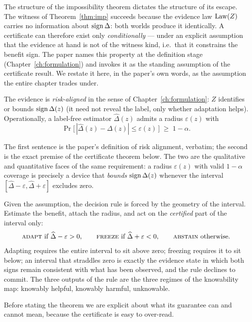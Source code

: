 The structure of the impossibility theorem dictates the structure of its escape. The
witness of Theorem~\ref{thm:imp} succeeds because the evidence law $\mathrm{Law}(Z)$ carries no
information about $\operatorname{sign}\Delta$: both worlds produce it identically. A certificate can
therefore exist only \emph{conditionally} --- under an explicit assumption that the
evidence at hand is not of the witness kind, i.e.\ that it constrains the benefit sign.
The paper names this property at the definition stage (Chapter~\ref{ch:formulation})
and invokes it as the standing assumption of the certificate result. We restate it
here, in the paper's own words, as the assumption the entire chapter trades under.

\begin{assumption}
\label{sec:t2-ass-align}
The evidence is \emph{risk-aligned} in the sense of Chapter~\ref{ch:formulation}:
$Z$ identifies or bounds $\operatorname{sign}\Delta(z)$ (it need not reveal the label, only whether
adaptation helps). Operationally, a label-free estimator $\widehat\Delta(z)$ admits a
radius $\varepsilon(z)$ with
\[
\Pr\bigl[\,|\widehat\Delta(z)-\Delta(z)|\le \varepsilon(z)\,\bigr]\;\ge\;1-\alpha .
\]
\end{assumption}

The first sentence is the paper's definition of risk alignment, verbatim; the second is
the exact premise of the certificate theorem below. The two are the qualitative and
quantitative faces of the same requirement: a radius $\varepsilon(z)$ with valid
$1-\alpha$ coverage is precisely a device that \emph{bounds} $\operatorname{sign}\Delta(z)$ whenever
the interval $[\widehat\Delta-\varepsilon,\widehat\Delta+\varepsilon]$ excludes zero.

Given the assumption, the decision rule is forced by the geometry of the interval.
Estimate the benefit, attach the radius, and act on the \emph{certified} part of the
interval only:
\[
\textsc{adapt}\ \text{if}\ \widehat\Delta-\varepsilon>0,\qquad
\textsc{freeze}\ \text{if}\ \widehat\Delta+\varepsilon<0,\qquad
\textsc{abstain}\ \text{otherwise.}
\]
Adapting requires the entire interval to sit above zero; freezing requires it to sit
below; an interval that straddles zero is exactly the evidence state in which both
signs remain consistent with what has been observed, and the rule declines to commit.
The three outputs of the rule are the three regimes of the knowability map: knowably
helpful, knowably harmful, unknowable.

Before stating the theorem we are explicit about what its guarantee can and cannot
mean, because the certificate is easy to over-read.

